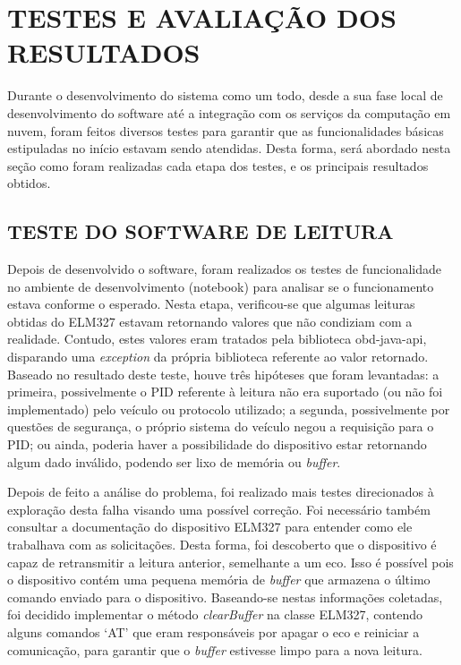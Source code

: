 \chapter{TESTES E AVALIAÇÃO DOS RESULTADOS}\label{CAP6}
Durante o desenvolvimento do sistema como um todo, desde a sua fase local de desenvolvimento do software até a integração com os serviços da computação em nuvem, foram feitos diversos testes para garantir que as funcionalidades básicas estipuladas no início estavam sendo atendidas. Desta forma, será abordado nesta seção como foram realizadas cada etapa dos testes, e os principais resultados obtidos.

\section{TESTE DO SOFTWARE DE LEITURA}
Depois de desenvolvido o software, foram realizados os testes de funcionalidade no ambiente de desenvolvimento (notebook) para analisar se o funcionamento estava conforme o esperado. Nesta etapa, verificou-se que algumas leituras obtidas do ELM327 estavam retornando valores que não condiziam com a realidade. Contudo, estes valores eram tratados pela biblioteca obd-java-api, disparando uma \textit{exception} da própria biblioteca referente ao valor retornado. Baseado no resultado deste teste, houve três hipóteses que foram levantadas: a primeira, possivelmente o PID referente à leitura não era suportado (ou não foi implementado) pelo veículo ou protocolo utilizado; a segunda, possivelmente por questões de segurança, o próprio sistema do veículo negou a requisição para o PID; ou ainda, poderia haver a possibilidade do dispositivo estar retornando algum dado inválido, podendo ser lixo de memória ou \textit{buffer}.

Depois de feito a análise do problema, foi realizado mais testes direcionados à exploração desta falha visando uma possível correção. Foi necessário também consultar a documentação do dispositivo ELM327 para entender como ele trabalhava com as solicitações. Desta forma, foi descoberto que o dispositivo é capaz de retransmitir a leitura anterior, semelhante a um eco. Isso é possível pois o dispositivo contém uma pequena memória de \textit{buffer} que armazena o último comando enviado para o dispositivo. Baseando-se nestas informações coletadas, foi decidido implementar o método \textit{clearBuffer} na classe ELM327, contendo alguns comandos ‘AT’ que eram responsáveis por apagar o eco e reiniciar a comunicação, para garantir que o \textit{buffer} estivesse limpo para a nova leitura.

